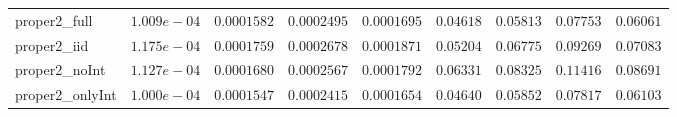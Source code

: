 \begin{table}
\begin{tabular}{lcccccccc}
proper2_full  & $1.009e-04$ & $0.0001582$ & $0.0002495$ & $0.0001695$ & $0.04618$ & $0.05813$ & $0.07753$ & $0.06061$ \\
proper2_iid  & $1.175e-04$ & $0.0001759$ & $0.0002678$ & $0.0001871$ & $0.05204$ & $0.06775$ & $0.09269$ & $0.07083$ \\
proper2_noInt  & $1.127e-04$ & $0.0001680$ & $0.0002567$ & $0.0001792$ & $0.06331$ & $0.08325$ & $0.11416$ & $0.08691$ \\
proper2_onlyInt  & $1.000e-04$ & $0.0001547$ & $0.0002415$ & $0.0001654$ & $0.04640$ & $0.05852$ & $0.07817$ & $0.06103$ \\
\hline 
\end{tabular}


\end{table}
